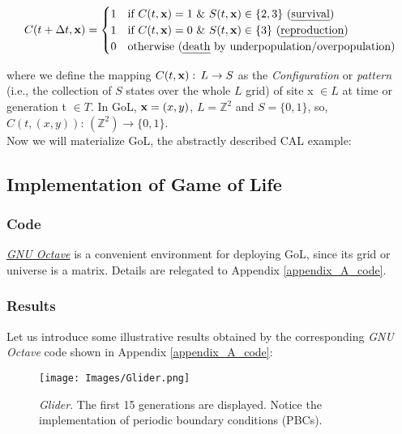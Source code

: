 \documentclass[11pt]{article}
\numberwithin{equation}{section} %
\numberwithin{figure}{section} %
\begin{document}
\begin{itemize}
\[
  {C}(t+\Delta t,{\bf x})=
  \begin{cases}
 1 & \text{if ${C}(t,{\bf x})=1$ \& ${S}(t,{\bf x})\in\{2,3\}$ (\emph{survival})} \\
 1 & \text{if ${C}(t,{\bf x})=0$ \& ${S}(t,{\bf x})\in\{3\}$ (\emph{reproduction})}\\
 0 & \text{otherwise (\emph{death} by underpopulation/overpopulation)}
  \end{cases}
\]
 \end{itemize}
where we define the mapping $C(t,{\bf x}):\,L\rightarrow S$ as the \emph{Configuration} or \emph{pattern} (i.e., the collection of $S$ states over the whole $L$ grid) of site x $\in L$ at time or generation t $\in T$. In GoL, ${\bf x}=(x,y)$, $L=\mathbb{Z}^2$ and $S=\{0,1\}$, so, $C(t,(x,y)):\,(\mathbb{Z}^2)\rightarrow \{0,1\}$. \cite[p.~136]{Adamatzky}\\

Now we will materialize GoL, the abstractly described CAL example:

\vspace{0.5cm}

\subsection{Implementation of Game of Life}

\subsubsection{Code}

\href{https://www.gnu.org/software/octave/}{\emph{GNU Octave}} is a convenient environment for deploying GoL, since its grid or universe is a matrix. Details are relegated to Appendix \ref{appendix_A_code}.

\subsubsection{Results}
Let us introduce some illustrative results obtained by the corresponding \emph{GNU Octave} code shown in Appendix \ref{appendix_A_code}:

\begin{figure}[H] 
	\centering
	\texttt{[image: Images/Glider.png]}
	\caption{\emph{Glider}. The first 15 generations are displayed. Notice the implementation of periodic boundary conditions (PBCs).}
	  \label{fig:Glider}
\end{figure}
\end{document}
